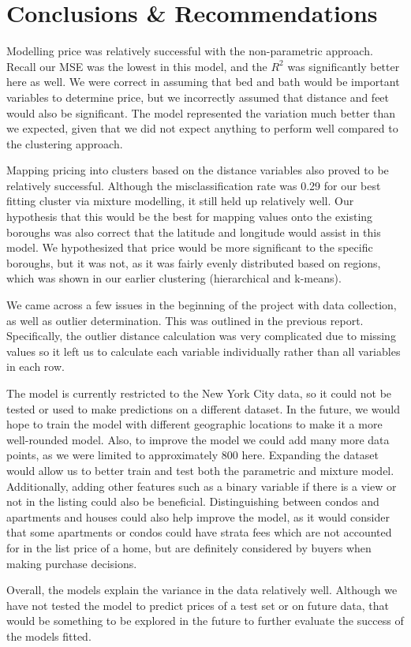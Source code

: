 \documentclass[11pt, a4paper]{article}
\begin{document}
\pagebreak

\section{Conclusions \& Recommendations}

Modelling price was relatively successful with the non-parametric approach. Recall our MSE was the lowest in this model, and the $R^2$ was significantly better here as well. We were correct in assuming that bed and bath would be important variables to determine price, but we incorrectly assumed that distance and feet would also be significant. The model represented the variation much better than we expected, given that we did not expect anything to perform well compared to the clustering approach.

Mapping pricing into clusters based on the distance variables also proved to be relatively successful. Although the misclassification rate was 0.29 for our best fitting cluster via mixture modelling, it still held up relatively well. Our hypothesis that this would be the best for mapping values onto the existing boroughs was also correct that the latitude and longitude would assist in this model. We hypothesized that price would be more significant to the specific boroughs, but it was not, as it was fairly evenly distributed based on regions, which was shown in our earlier clustering (hierarchical and k-means).

We came across a few issues in the beginning of the project with data collection, as well as outlier determination. This was outlined in the previous report. Specifically, the outlier distance calculation was very complicated due to missing values so it left us to calculate each variable individually rather than all variables in each row.

The model is currently restricted to the New York City data, so it could not be tested or used to make predictions on a different dataset. In the future, we would hope to train the model with different geographic locations to make it a more well-rounded model. Also, to improve the model we could add many more data points, as we were limited to approximately 800 here. Expanding the dataset would allow us to better train and test both the parametric and mixture model. Additionally, adding other features such as a binary variable if there is a view or not in the listing could also be beneficial. Distinguishing between condos and apartments and houses could also help improve the model, as it would consider that some apartments or condos could have strata fees which are not accounted for in the list price of a home, but are definitely considered by buyers when making purchase decisions.

Overall, the models explain the variance in the data relatively well. Although we have not tested the model to predict prices of a test set or on future data, that would be something to be explored in the future to further evaluate the success of the models fitted.
\end{document}
